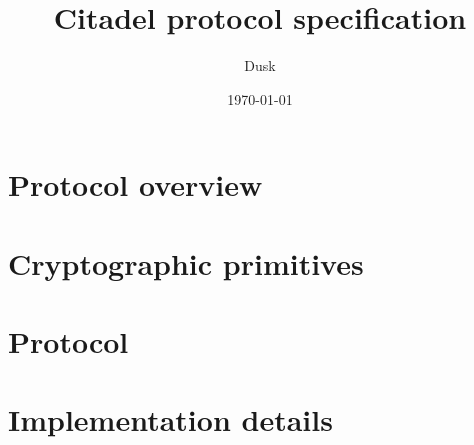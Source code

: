 \documentclass{article}
\title{Citadel protocol specification}
\author{Dusk}
\date{\today}
\begin{document}
	
\maketitle
\vspace{0.6cm}

\tableofcontents

\newpage

\section{Protocol overview}
\label{sec:general-overview}


\vspace{0.5cm}
\section{Cryptographic primitives}
\label{sec:crypto-primitives}


\section{Protocol}
\label{sec:protocol}


\section{Implementation details}
\label{sec:implementation}


%
%
%



\end{document}
